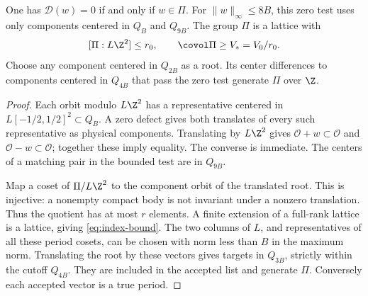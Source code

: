 \begin{lemma}\label{lem:recognition}
One has $\mathcal D(w)=0$ if and only if $w\in\Pi$. For
$\|w\|_\infty\le8B$, this zero test uses only components centered in
$Q_B$ and $Q_{9B}$. The group $\Pi$ is a lattice with
\begin{equation}\label{eq:index-bound}
 [\Pi:L\Z^2]\le r_0,\qquad\covol\Pi\ge V_*=V_0/r_0.
\end{equation}
Choose any component centered in $Q_{2B}$ as a root. Its center
differences to components centered in $Q_{4B}$ that pass the zero
test generate $\Pi$ over $\Z$.
\end{lemma}
\begin{proof}
Each orbit modulo $L\Z^2$ has a representative centered in
$L[-1/2,1/2]^2\subset Q_B$. A zero defect gives both translates of
every such representative as physical components. Translating by
$L\Z^2$ gives $\mathcal O+w\subset\mathcal O$ and
$\mathcal O-w\subset\mathcal O$; together these imply equality.
The converse is immediate. The centers of a matching pair in the
bounded test are in $Q_{9B}$.

Map a coset of $\Pi/L\Z^2$ to the component orbit of the translated
root. This is injective: a nonempty compact body is not invariant
under a nonzero translation. Thus the quotient has at most $r$ elements.
A finite extension of a full-rank lattice is a lattice, giving
\eqref{eq:index-bound}. The two columns of $L$, and representatives
of all these period cosets, can be chosen with norm less than $B$
in the maximum norm. Translating the root by these vectors gives
targets in $Q_{3B}$, strictly within the cutoff $Q_{4B}$. They are
included in the accepted list and generate $\Pi$. Conversely each
accepted vector is a true period.
\end{proof}


